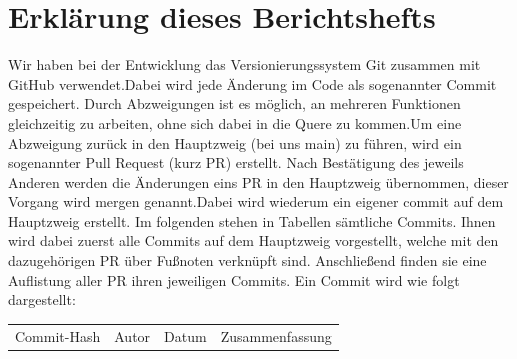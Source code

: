 \documentclass{article}%
\begin{document}
%
\normalsize%
\section{Erklärung dieses Berichtshefts}%
\label{sec:ErklrungdiesesBerichtshefts}%
Wir haben bei der Entwicklung das Versionierungssystem Git zusammen mit GitHub verwendet.Dabei wird jede Änderung im Code als sogenannter Commit gespeichert. Durch Abzweigungen ist es möglich, an mehreren Funktionen gleichzeitig zu arbeiten, ohne sich dabei in die Quere zu kommen.Um eine Abzweigung zurück in den Hauptzweig (bei uns main) zu führen, wird ein sogenannter Pull Request (kurz PR) erstellt. Nach Bestätigung des jeweils Anderen werden die Änderungen eins PR in den Hauptzweig übernommen, dieser Vorgang wird mergen genannt.Dabei wird wiederum ein eigener commit auf dem Hauptzweig erstellt.%
\newline%
\newline%
%
Im folgenden stehen in Tabellen sämtliche Commits. Ihnen wird dabei zuerst alle Commits auf dem Hauptzweig vorgestellt, welche mit den dazugehörigen PR über Fußnoten verknüpft sind. Anschließend finden sie eine Auflistung aller PR ihren jeweiligen Commits. %
\newline%
\newline%
%
Ein Commit wird wie folgt dargestellt:%
\begin{longtable}{l l l p{12cm}}%
Commit{-}Hash&Autor&Datum&Zusammenfassung\\%
\end{longtable}%

%
\end{document}
